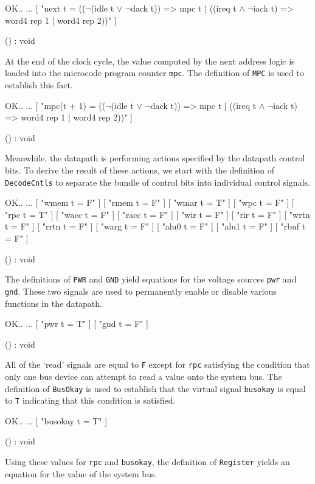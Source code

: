\begintt
OK..
    \(\ldots\)
    [ "next t =
       ((\(\neg\)(idle t \(\vee\) \(\neg\)dack t)) => 
        mpc t | 
        ((ireq t \(\wedge\) \(\neg\)iack t) => word4 rep 1 | word4 rep 2))" ]

() : void
\endtt

At the end of the clock cycle,
the value computed by the next address logic is loaded into
the microcode program counter \verb"mpc".
The definition of \verb"MPC" is used to establish this fact.

\begintt
OK..
    \(\ldots\)
    [ "mpc(t + 1) =
       ((\(\neg\)(idle t \(\vee\) \(\neg\)dack t)) => 
        mpc t | 
        ((ireq t \(\wedge\) \(\neg\)iack t) => word4 rep 1 | word4 rep 2))" ]

() : void
\endtt


Meanwhile,
the datapath is performing actions specified by the datapath control bits.
To derive the result of these actions,
we start with the definition of \verb"DecodeCntls" to separate
the bundle of control bits into individual control signals.

\newpage %


\begintt
OK..
   \(\ldots\)
    [ "wmem t = F" ]
    [ "rmem t = F" ]
    [ "wmar t = T" ]
    [ "wpc t = F" ]
    [ "rpc t = T" ]
    [ "wacc t = F" ]
    [ "racc t = F" ]
    [ "wir t = F" ]
    [ "rir t = F" ]
    [ "wrtn t = F" ]
    [ "rrtn t = F" ]
    [ "warg t = F" ]
    [ "alu0 t = F" ]
    [ "alu1 t = F" ]
    [ "rbuf t = F" ]

() : void
\endtt

The definitions of \verb"PWR" and \verb"GND" yield
equations for the voltage sources \verb"pwr" and \verb"gnd".
These two signals are used to permanently enable or disable various
functions in the datapath.

\begintt
OK..
   \(\ldots\)
    [ "pwr t = T" ]
    [ "gnd t = F" ]

() : void
\endtt

All of the `read' signals are equal to \verb"F" except for \verb"rpc"
satisfying the condition that only one bus device can attempt to read
a value onto the system bus.
The definition of \verb"BusOkay" is used to establish
that the virtual signal \verb"busokay" is equal to \verb"T"
indicating that this condition is satisfied.

\begintt
OK..
   \(\ldots\)
    [ "busokay t = T" ]

() : void
\endtt

Using these values for \verb"rpc" and \verb"busokay",
the definition of \verb"Register" yields an equation
for the value of the system bus.

